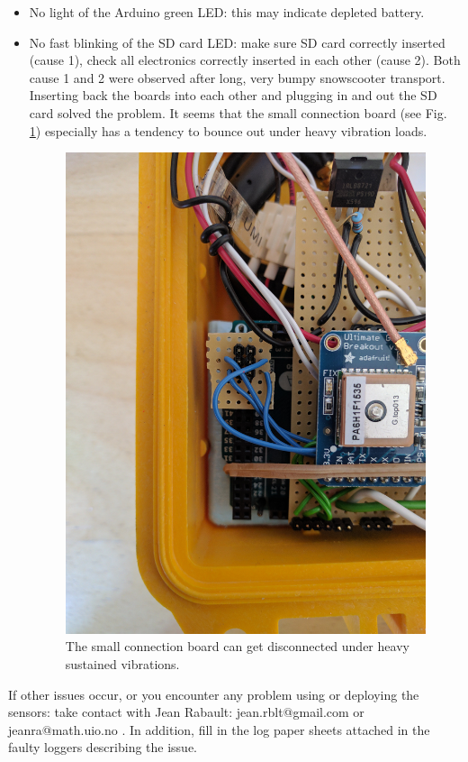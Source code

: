 \documentclass[pdftex,a4paper,12pt,twocolumn,fleqn,captions=tableheading]{scrartcl}
\begin{document}
\begin{itemize}
  \item No light of the Arduino green LED: this may indicate depleted battery.

  \item No fast blinking of the SD card LED: make sure SD card correctly inserted (cause 1), check all electronics correctly inserted in each other (cause 2). Both cause 1 and 2 were observed after long, very bumpy snowscooter transport. Inserting back the boards into each other and plugging in and out the SD card solved the problem. It seems that the small connection board (see Fig. \ref{smallBoard}) especially has a tendency to bounce out under heavy vibration loads.

  \begin{figure}
  \begin{center}
  \includegraphics[width=.4\textwidth]{Figures/IMG_20170418_140411}
  \caption{\label{smallBoard} The small connection board can get disconnected under heavy sustained vibrations.}
  \end{center}
  \end{figure}

\end{itemize}

If other issues occur, or you encounter any problem using or deploying the sensors: take contact with Jean Rabault: jean.rblt@gmail.com or jeanra@math.uio.no . In addition, fill in the log paper sheets attached in the faulty loggers describing the issue.
\end{document}
